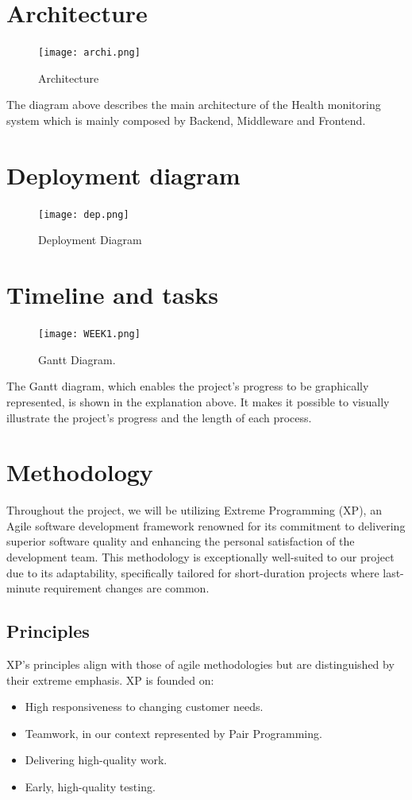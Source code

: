 \documentclass[12pt]{article}
\begin{document}
\section{Architecture}
\begin{figure}[H]
    \centering
    \texttt{[image: archi.png]}
    \caption{Architecture}
    \label{fig:architecture}
\end{figure}
The diagram above describes the main architecture of the Health monitoring system which is mainly composed by Backend, Middleware and Frontend.
\section{Deployment diagram}
\begin{figure}[H]
    \centering
    \texttt{[image: dep.png]}
    \caption{Deployment Diagram}
    \label{fig:Deployment Diagram}
\end{figure}

\section{Timeline and tasks}
\begin{figure}[H]
    \centering
    \texttt{[image: WEEK1.png]}
    \caption{Gantt Diagram.}
    \label{fig:Gantt}
\end{figure}
\newpage
The Gantt diagram, which enables the project's progress to be graphically represented, is shown in the explanation above. It makes it possible to visually illustrate the project's progress and the length of each process.


\section{Methodology}
Throughout the project, we will be utilizing Extreme Programming (XP), an Agile software development framework renowned for its commitment to delivering superior software quality and enhancing the personal satisfaction of the development team. This methodology is exceptionally well-suited to our project due to its adaptability, specifically tailored for short-duration projects where last-minute requirement changes are common.

\subsection{Principles}
XP's principles align with those of agile methodologies but are distinguished by their extreme emphasis. XP is founded on:
\begin{itemize}
    \item High responsiveness to changing customer needs.
    \item Teamwork, in our context represented by Pair Programming.
    \item Delivering high-quality work.
    \item Early, high-quality testing.
\end{itemize}
\end{document}
